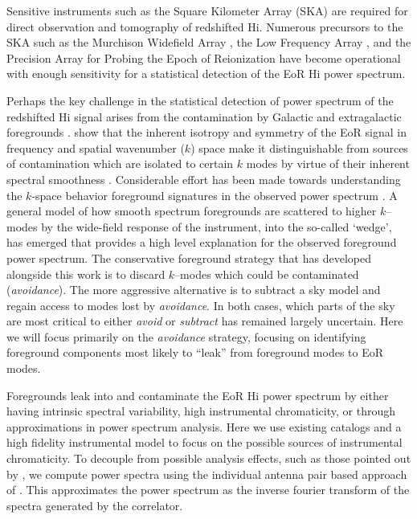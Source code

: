 \documentclass[preprint2,iop,numberedappendix]{emulateapj}
\begin{document}
Sensitive instruments such as the Square Kilometer Array (SKA) are required for direct observation and tomography of redshifted H{\sc i}. Numerous precursors to the SKA such as the Murchison Widefield Array \citep[MWA;][]{lon09,tin13}, the Low Frequency Array \citep[LOFAR;][]{van13}, and the Precision Array for Probing the Epoch of Reionization \citep[PAPER;][]{par10} have become operational with enough sensitivity for a statistical detection of the EoR H{\sc i} power spectrum. 

Perhaps the key challenge in the statistical detection of power spectrum of the redshifted H{\sc i} signal arises from the contamination by Galactic and extragalactic foregrounds \citep[see, e.g.,][]{dim02,zal04,fur06}. \citet{mor04} show that the inherent isotropy and symmetry of the EoR signal in frequency and spatial wavenumber ($k$) space make it distinguishable from sources of contamination which are isolated to certain $k$ modes by virtue of their inherent spectral smoothness \citep{mor06,bow09,liu11,par12,dil13}. Considerable effort has been made towards understanding the $k$-space behavior foreground signatures in the observed power spectrum \citep{thy13,pob13,mor12,tro12,dat10,bow09}. A general model of how smooth spectrum foregrounds are scattered to higher $k$--modes by the wide-field response of the instrument, into the so-called `wedge', has emerged that provides a high level explanation for the observed foreground power spectrum. The conservative foreground strategy that has developed alongside this work is to discard $k$--modes which could be contaminated ({\it avoidance}). The more aggressive alternative is to subtract a sky model and regain access to modes lost by {\it avoidance}. In both cases, which parts of the sky are most critical to either {\it avoid} or {\it subtract} has remained largely uncertain. Here we will focus primarily on the {\it avoidance} strategy, focusing on identifying foreground components most likely to ``leak'' from foreground modes to EoR modes.

Foregrounds leak into and contaminate the EoR H{\sc i} power spectrum by either having intrinsic spectral variability, high instrumental chromaticity, or through approximations in power spectrum analysis. Here we use existing catalogs and a high fidelity instrumental model to focus on the possible sources of instrumental chromaticity. 
To decouple from possible analysis effects, such as those pointed out by \citet{haz13}, we compute power spectra using the individual antenna pair based approach of \citet{pob13,par14}. This approximates the power spectrum as the inverse fourier transform of the spectra generated by the correlator. 
\end{document}
